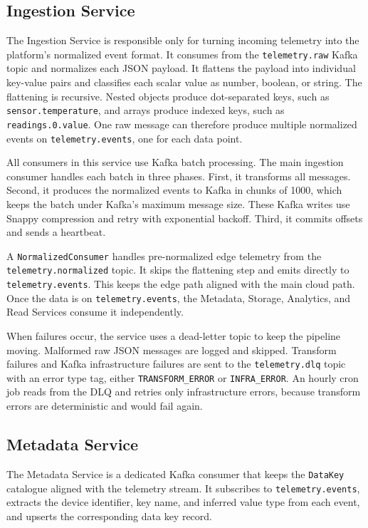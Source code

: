 \subsection{Ingestion Service}
\label{subsec:IngestionServiceImpl}

The Ingestion Service is responsible only for turning incoming telemetry into the platform's normalized event format. It consumes from the \texttt{telemetry.raw} Kafka topic and normalizes each \gls{JSON} payload. It flattens the payload into individual key-value pairs and classifies each scalar value as number, boolean, or string. The flattening is recursive. Nested objects produce dot-separated keys, such as \texttt{sensor.temperature}, and arrays produce indexed keys, such as \texttt{readings.0.value}. One raw message can therefore produce multiple normalized events on \texttt{telemetry.events}, one for each data point.

All consumers in this service use Kafka batch processing. The main ingestion consumer handles each batch in three phases. First, it transforms all messages. Second, it produces the normalized events to Kafka in chunks of 1000, which keeps the batch under Kafka's maximum message size. These Kafka writes use Snappy compression and retry with exponential backoff. Third, it commits offsets and sends a heartbeat.

A \texttt{NormalizedConsumer} handles pre-normalized edge telemetry from the \texttt{telemetry.normalized} topic. It skips the flattening step and emits directly to \texttt{telemetry.events}. This keeps the edge path aligned with the main cloud path. Once the data is on \texttt{telemetry.events}, the Metadata, Storage, Analytics, and Read Services consume it independently.

When failures occur, the service uses a dead-letter topic to keep the pipeline moving. Malformed raw \gls{JSON} messages are logged and skipped. Transform failures and Kafka infrastructure failures are sent to the \texttt{telemetry.dlq} topic with an error type tag, either \texttt{TRANSFORM\_ERROR} or \texttt{INFRA\_ERROR}. An hourly cron job reads from the \gls{DLQ} and retries only infrastructure errors, because transform errors are deterministic and would fail again.

\subsection{Metadata Service}
\label{subsec:MetadataServiceImpl}

The Metadata Service is a dedicated Kafka consumer that keeps the \texttt{DataKey} catalogue aligned with the telemetry stream. It subscribes to \texttt{telemetry.events}, extracts the device identifier, key name, and inferred value type from each event, and upserts the corresponding data key record.

